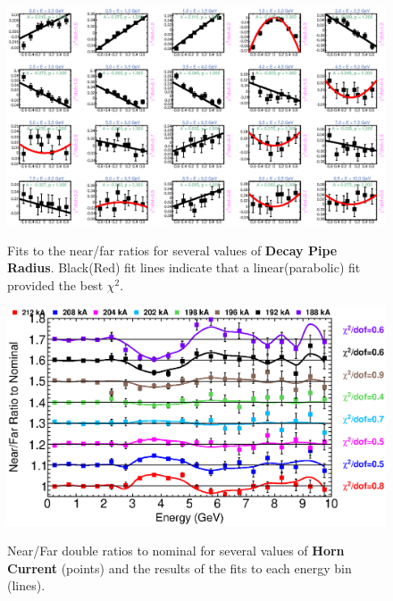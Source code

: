 \begin{figure}[ht]
  \begin{center}
    {\includegraphics[width=5.0in]{figures/DecayPipeRadius_nof_fits.eps}}
  \end{center}
\caption{ Fits to the near/far ratios for several values of {\bf Decay Pipe Radius}. Black(Red) fit lines indicate that a linear(parabolic) fit provided the best $\chi^2$. }
\end{figure}

\begin{figure}[ht]
  \begin{center}
    {\includegraphics[width=6.0in]{figures/HornCurrent_nof_summary.eps}}
  \end{center}
\caption{ Near/Far double ratios to nominal for several values of {\bf Horn Current} (points) and the results of the fits to each energy bin (lines).}
\end{figure}

